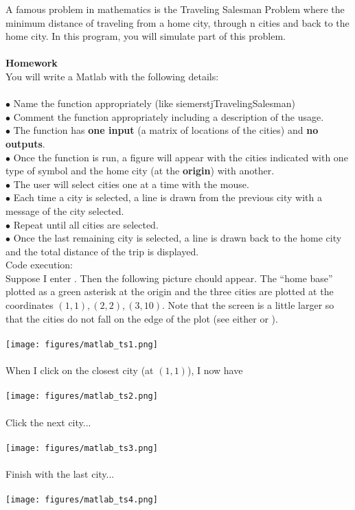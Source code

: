A famous problem in mathematics is the Traveling Salesman Problem where the minimum distance of traveling from a home city, through n cities and back to the home city.  In this program, you will simulate part of this problem.\\
\\
{\bf Homework}\\

You will write a Matlab  with the following details:\\
\\
$\bullet$  Name the function appropriately (like siemerstjTravelingSalesman)\\
$\bullet$  Comment the function appropriately including a description of the usage.\\
$\bullet$  The function has \textbf{one input} (a matrix of locations of the cities) and \textbf{no outputs}.\\
$\bullet$  Once the function is run, a figure will appear with the cities indicated with one type of symbol and the home city (at the {\bf origin}) with another.\\
$\bullet$  The user will select cities one at a time with the mouse.\\
$\bullet$  Each time a city is selected, a line is drawn from the previous city with a message of the city selected.\\
$\bullet$  Repeat until all cities are selected.\\
$\bullet$  Once the last remaining city is selected, a line is drawn back to the home city and the total distance of the trip is displayed.\\

Code execution:\\

Suppose I enter .  Then the following picture chould appear.  The ``home base'' plotted as a green asterisk at the origin and the three cities are plotted at the coordinates $(1,1), (2,2), (3,10)$.  Note that the screen is a little larger so that the cities do not fall on the edge of the plot (see either  or ).\\
\\
\texttt{[image: figures/matlab\_ts1.png]}\\
\\
When I click on the closest city (at $(1,1)$), I now have\\
\\
\texttt{[image: figures/matlab\_ts2.png]}\\
\\
Click the next city...\\
\\
\texttt{[image: figures/matlab\_ts3.png]}\\
\\
Finish with the last city...\\
\\
\texttt{[image: figures/matlab\_ts4.png]}\\

